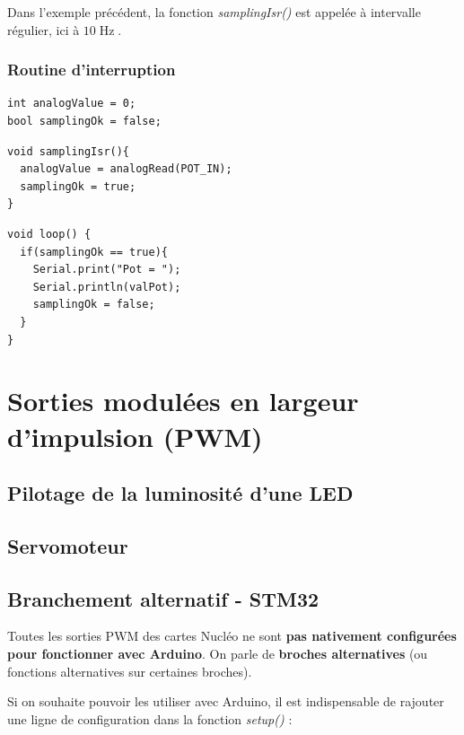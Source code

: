 \documentclass[a4paper,11pt,titlepage]{article} %
\begin{document}
Dans l'exemple précédent, la fonction \textsl{samplingIsr()} est appelée à intervalle régulier, ici à $10\operatorname{Hz}$.

\subsubsection{Routine d'interruption}

\begin{lstlisting}
int analogValue = 0;
bool samplingOk = false;
\end{lstlisting}


\begin{lstlisting}
void samplingIsr(){
  analogValue = analogRead(POT_IN);
  samplingOk = true;
}
\end{lstlisting}


\begin{lstlisting}
void loop() {
  if(samplingOk == true){
    Serial.print("Pot = ");
    Serial.println(valPot);
    samplingOk = false;
  }
}
\end{lstlisting}


\newpage
\section{Sorties modulées en largeur d'impulsion (PWM)}


\subsection{Pilotage de la luminosité d'une LED}


\subsection{Servomoteur}


\subsection{Branchement alternatif - STM32}

Toutes les sorties PWM des cartes Nucléo ne sont \textbf{pas nativement configurées pour fonctionner avec Arduino}. On parle de \textbf{broches alternatives} (ou fonctions alternatives sur certaines broches).

Si on souhaite pouvoir les utiliser avec Arduino, il est indispensable de rajouter une ligne de configuration dans la fonction \textsl{setup()} :
\end{document}
